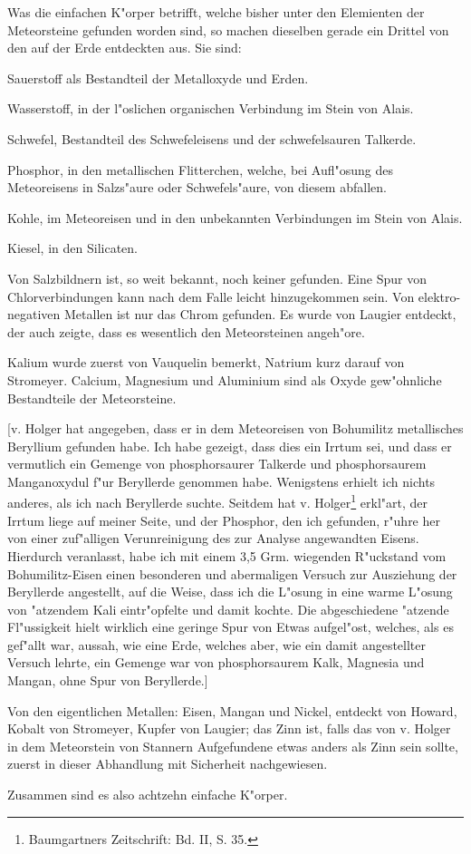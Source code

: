 \documentclass[a4paper, 11pt, oneside]{article}
\begin{document}
Was die einfachen K"orper betrifft, welche bisher unter den Elemienten der Meteorsteine gefunden worden sind, so machen dieselben gerade ein Drittel von den auf der Erde entdeckten aus. Sie sind:

Sauerstoff als Bestandteil der Metalloxyde und Erden.

Wasserstoff, in der l"oslichen organischen Verbindung im Stein von Alais.

Schwefel, Bestandteil des Schwefeleisens und der schwefelsauren Talkerde.

Phosphor, in den metallischen Flitterchen, welche, bei Aufl"osung des Meteoreisens in Salzs"aure oder Schwefels"aure, von diesem abfallen.

Kohle, im Meteoreisen und in den unbekannten Verbindungen im Stein von Alais.

Kiesel, in den Silicaten.

Von Salzbildnern ist, so weit bekannt, noch keiner gefunden. Eine Spur von Chlorverbindungen kann nach dem Falle leicht hinzugekommen sein. Von elektro-negativen Metallen ist nur das Chrom gefunden. Es wurde von Laugier entdeckt, der auch zeigte, dass es wesentlich den Meteorsteinen angeh"ore.

Kalium wurde zuerst von Vauquelin bemerkt, Natrium kurz darauf von Stromeyer. Calcium, Magnesium und Aluminium sind als Oxyde gew"ohnliche Bestandteile der Meteorsteine.

[v. Holger hat angegeben, dass er in dem Meteoreisen von Bohumilitz metallisches Beryllium gefunden habe. Ich habe gezeigt, dass dies ein Irrtum sei, und dass er vermutlich ein Gemenge von phosphorsaurer Talkerde und phosphorsaurem Manganoxydul f"ur Beryllerde genommen habe. Wenigstens erhielt ich nichts anderes, als ich nach Beryllerde suchte. Seitdem hat v. Holger\footnote{Baumgartners Zeitschrift: Bd. II, S. 35.} erkl"art, der Irrtum liege auf meiner Seite, und der Phosphor, den ich gefunden, r"uhre her von einer zuf"alligen Verunreinigung des zur Analyse angewandten Eisens. Hierdurch veranlasst, habe ich mit einem 3,5 Grm. wiegenden R"uckstand vom Bohumilitz-Eisen einen besonderen und abermaligen Versuch zur Ausziehung der Beryllerde angestellt, auf die Weise, dass ich die L"osung in eine warme L"osung von "atzendem Kali eintr"opfelte und damit kochte. Die abgeschiedene "atzende Fl"ussigkeit hielt wirklich eine geringe Spur von Etwas aufgel"ost, welches, als es gef"allt war, aussah, wie eine Erde, welches aber, wie ein damit angestellter Versuch lehrte, ein Gemenge war von phosphorsaurem Kalk, Magnesia und Mangan, ohne Spur von Beryllerde.]

Von den eigentlichen Metallen: Eisen, Mangan und Nickel, entdeckt von Howard, Kobalt von Stromeyer, Kupfer von Laugier; das Zinn ist, falls das von v. Holger in dem Meteorstein von Stannern Aufgefundene etwas anders als Zinn sein sollte, zuerst in dieser Abhandlung mit Sicherheit nachgewiesen.

Zusammen sind es also achtzehn einfache K"orper.
\clearpage
\end{document}
